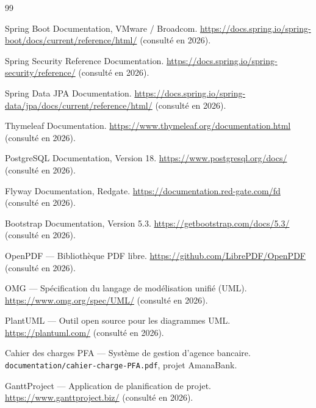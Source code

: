 \documentclass[11pt,a4paper,oneside]{report}
\newcommand{\nomapplication}{AmanaBank}
\begin{document}
\begin{thebibliography}{99}

Spring Boot Documentation, VMware / Broadcom.
\url{https://docs.spring.io/spring-boot/docs/current/reference/html/} (consulté en 2026).

Spring Security Reference Documentation.
\url{https://docs.spring.io/spring-security/reference/} (consulté en 2026).

Spring Data JPA Documentation.
\url{https://docs.spring.io/spring-data/jpa/docs/current/reference/html/} (consulté en 2026).

Thymeleaf Documentation.
\url{https://www.thymeleaf.org/documentation.html} (consulté en 2026).

PostgreSQL Documentation, Version 18.
\url{https://www.postgresql.org/docs/} (consulté en 2026).

Flyway Documentation, Redgate.
\url{https://documentation.red-gate.com/fd} (consulté en 2026).

Bootstrap Documentation, Version 5.3.
\url{https://getbootstrap.com/docs/5.3/} (consulté en 2026).

OpenPDF — Bibliothèque PDF libre.
\url{https://github.com/LibrePDF/OpenPDF} (consulté en 2026).

OMG — Spécification du langage de modélisation unifié (UML).
\url{https://www.omg.org/spec/UML/} (consulté en 2026).

PlantUML — Outil open source pour les diagrammes UML.
\url{https://plantuml.com/} (consulté en 2026).

Cahier des charges PFA — Système de gestion d'agence bancaire.
\texttt{documentation/cahier-charge-PFA.pdf}, projet \nomapplication.

GanttProject — Application de planification de projet.
\url{https://www.ganttproject.biz/} (consulté en 2026).

\end{thebibliography}
\end{document}
